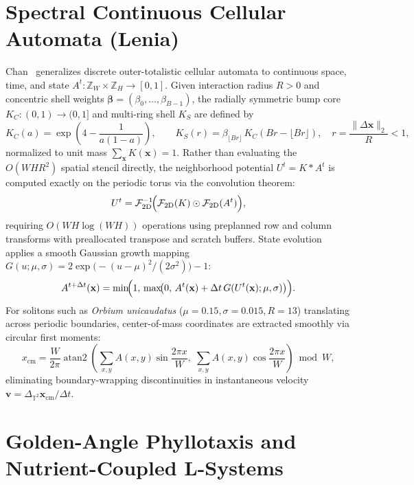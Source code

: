 \documentclass[12pt]{article}
\begin{document}
\section{Spectral Continuous Cellular Automata (Lenia)}

Chan~\cite{chan2019lenia} generalizes discrete outer-totalistic cellular automata to continuous space, time, and state $A^t : \mathbb{Z}_W \times \mathbb{Z}_H \to [0, 1]$. Given interaction radius $R > 0$ and concentric shell weights $\boldsymbol{\beta} = (\beta_0, \dots, \beta_{B-1})$, the radially symmetric bump core $K_C : (0, 1) \to (0, 1]$ and multi-ring shell $K_S$ are defined by
\begin{equation}
K_C(a) = \exp\!\left(4 - \frac{1}{a(1 - a)}\right), \qquad
K_S(r) = \beta_{\lfloor B r \rfloor}\, K_C(B r - \lfloor B r \rfloor), \quad r = \frac{\|\Delta \mathbf{x}\|_2}{R} < 1,
\end{equation}
normalized to unit mass $\sum_{\mathbf{x}} K(\mathbf{x}) = 1$. Rather than evaluating the $O(W H R^2)$ spatial stencil directly, the neighborhood potential $U^t = K * A^t$ is computed exactly on the periodic torus via the convolution theorem:
\begin{equation}
U^t = \mathcal{F}_{2\mathrm{D}}^{-1}\!\Bigl(\mathcal{F}_{2\mathrm{D}}(K) \odot \mathcal{F}_{2\mathrm{D}}(A^t)\Bigr),
\end{equation}
requiring $O(W H \log(W H))$ operations using preplanned row and column transforms with preallocated transpose and scratch buffers. State evolution applies a smooth Gaussian growth mapping $G(u; \mu, \sigma) = 2 \exp\!\bigl(-(u - \mu)^2 / (2\sigma^2)\bigr) - 1$:
\begin{equation}
A^{t + \Delta t}(\mathbf{x}) = \min\!\Bigl(1,\, \max\!\bigl(0,\, A^t(\mathbf{x}) + \Delta t\, G(U^t(\mathbf{x}); \mu, \sigma)\bigr)\Bigr).
\end{equation}
For solitons such as \emph{Orbium unicaudatus} ($\mu = 0.15, \sigma = 0.015, R = 13$) translating across periodic boundaries, center-of-mass coordinates are extracted smoothly via circular first moments:
\begin{equation}
x_{\mathrm{cm}} = \frac{W}{2\pi} \operatorname{atan2}\!\left(\sum_{x,y} A(x,y)\sin\frac{2\pi x}{W},\; \sum_{x,y} A(x,y)\cos\frac{2\pi x}{W}\right) \bmod W,
\end{equation}
eliminating boundary-wrapping discontinuities in instantaneous velocity $\mathbf{v} = \Delta_{\mathbb{T}^2}\mathbf{x}_{\mathrm{cm}} / \Delta t$.

\section{Golden-Angle Phyllotaxis and Nutrient-Coupled L-Systems}
\end{document}
